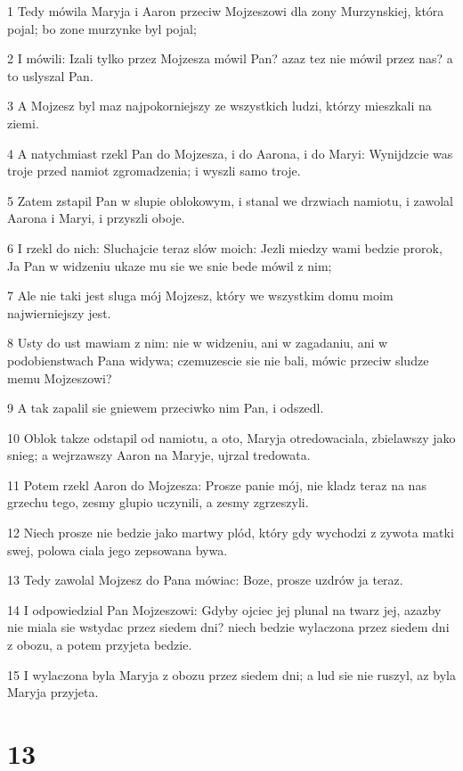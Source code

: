 \par 1 Tedy mówila Maryja i Aaron przeciw Mojzeszowi dla zony Murzynskiej, która pojal; bo zone murzynke byl pojal;
\par 2 I mówili: Izali tylko przez Mojzesza mówil Pan? azaz tez nie mówil przez nas? a to uslyszal Pan.
\par 3 A Mojzesz byl maz najpokorniejszy ze wszystkich ludzi, którzy mieszkali na ziemi.
\par 4 A natychmiast rzekl Pan do Mojzesza, i do Aarona, i do Maryi: Wynijdzcie was troje przed namiot zgromadzenia; i wyszli samo troje.
\par 5 Zatem zstapil Pan w slupie oblokowym, i stanal we drzwiach namiotu, i zawolal Aarona i Maryi, i przyszli oboje.
\par 6 I rzekl do nich: Sluchajcie teraz slów moich: Jezli miedzy wami bedzie prorok, Ja Pan w widzeniu ukaze mu sie we snie bede mówil z nim;
\par 7 Ale nie taki jest sluga mój Mojzesz, który we wszystkim domu moim najwierniejszy jest.
\par 8 Usty do ust mawiam z nim: nie w widzeniu, ani w zagadaniu, ani w podobienstwach Pana widywa; czemuzescie sie nie bali, mówic przeciw sludze memu Mojzeszowi?
\par 9 A tak zapalil sie gniewem przeciwko nim Pan, i odszedl.
\par 10 Oblok takze odstapil od namiotu, a oto, Maryja otredowaciala, zbielawszy jako snieg; a wejrzawszy Aaron na Maryje, ujrzal tredowata.
\par 11 Potem rzekl Aaron do Mojzesza: Prosze panie mój, nie kladz teraz na nas grzechu tego, zesmy glupio uczynili, a zesmy zgrzeszyli.
\par 12 Niech prosze nie bedzie jako martwy plód, który gdy wychodzi z zywota matki swej, polowa ciala jego zepsowana bywa.
\par 13 Tedy zawolal Mojzesz do Pana mówiac: Boze, prosze uzdrów ja teraz.
\par 14 I odpowiedzial Pan Mojzeszowi: Gdyby ojciec jej plunal na twarz jej, azazby nie miala sie wstydac przez siedem dni? niech bedzie wylaczona przez siedem dni z obozu, a potem przyjeta bedzie.
\par 15 I wylaczona byla Maryja z obozu przez siedem dni; a lud sie nie ruszyl, az byla Maryja przyjeta.

\chapter{13}

